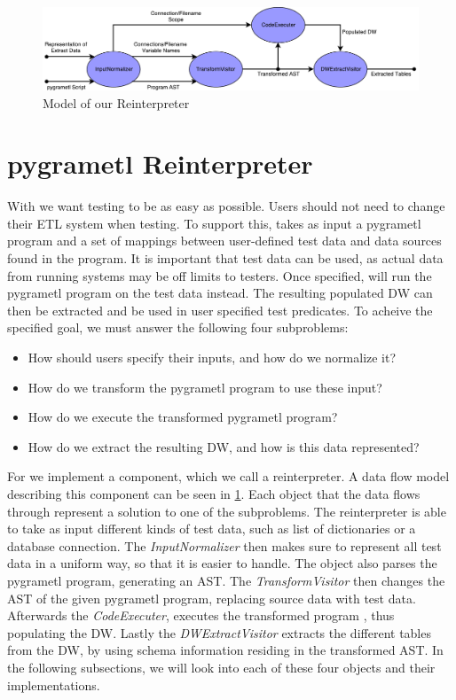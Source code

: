 \begin{figure}
  \centering
  \includegraphics[width=1\textwidth]{figures/reinterpreter_model.pdf}
  \caption{Model of our Reinterpreter}
  \label{fig:reinterpreter}
\end{figure}

\section{pygrametl Reinterpreter}\label{sect:reinterpreter}
With  \FW we want testing to be as easy as possible. Users should not need to  change their ETL system when testing. To support this, \FW takes as input a pygrametl program and a set of mappings between user-defined test data and data sources found in the program. It is important that test data can be used, as actual data from running systems may be off limits to testers. Once specified, \FW will run the pygrametl program on the test data instead. The resulting populated DW can then be extracted and be used in user specified test predicates. To acheive the specified goal, we must answer the following four subproblems: 

\begin{itemize}
\item How should users specify their inputs, and how do we normalize it?
\item How do we transform the pygrametl program to use these input?
\item How do we execute the transformed pygrametl program?
\item How do we extract the resulting DW, and how is this data represented? 
\end{itemize}

For \FW we implement a component, which we call a reinterpreter. A data flow model describing this component can be seen in \cref{fig:reinterpreter}. Each object that the data flows through represent a solution to one of the subproblems. The reinterpreter is able to take as input different kinds of test data, such as list of dictionaries or a database connection. The \textit{InputNormalizer} then makes sure to represent all test data in a uniform way, so that it is easier to handle. The object also parses the pygrametl program, generating an AST. The \textit{TransformVisitor} then changes the AST of the given pygrametl program, replacing source data with test data. Afterwards the \textit{CodeExecuter}, executes the transformed program , thus populating the DW. Lastly the \textit{DWExtractVisitor} extracts the different tables from the DW, by using schema information residing in the transformed AST. In the following subsections, we will look into each of these four objects and their implementations.

